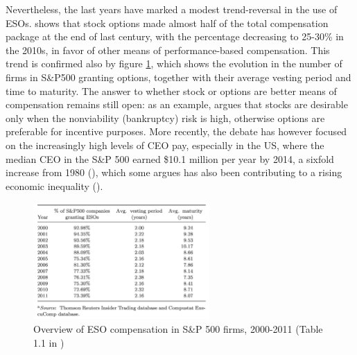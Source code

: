 Nevertheless, the last years have marked a modest trend-reversal in the use of ESOs. \cite{frydman2010ceo} shows that stock options made almost half of the total compensation package at the end of last century, with the percentage decreasing to 25-30\% in the 2010s, in favor of other means of performance-based compensation. This trend is confirmed also by figure \ref{fig:leung_tab_1-1}, which shows the evolution in the number of firms in S\&P500 granting options, together with their average vesting period and time to maturity. The answer to whether stock or options are better means of compensation remains still open: as an example, \cite{kadan2008stocks} argues that stocks are desirable only when the nonviability (bankruptcy) risk is high, otherwise options are preferable for incentive purposes. 
More recently, the debate has however focused on the increasingly high levels of CEO pay, especially in the US, where the median CEO in the S\&P 500 earned \$10.1 million per year by 2014, a sixfold increase from 1980 (\cite{edmans2017executive}), which some argues has also been contributing to a rising economic inequality (\cite{mishel2012ceo}).

\vspace*{15pt}
\begin{figure}[H]
    \centering
    \includegraphics[width=0.6\textwidth]{fig/2/Leung_tab1-1.png}
    \caption{Overview of ESO compensation in S\&P 500 firms, 2000-2011 (Table 1.1 in \cite{leung2021employee})}
    \label{fig:leung_tab_1-1}
\end{figure}
\vspace*{15pt}


